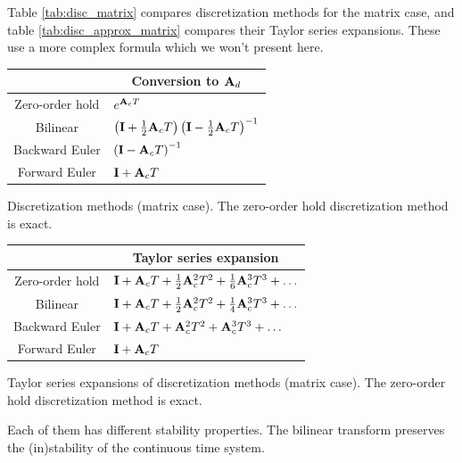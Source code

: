 Table \ref{tab:disc_matrix} compares \gls{discretization} methods for the matrix
case, and table \ref{tab:disc_approx_matrix} compares their Taylor series
expansions. These use a more complex formula which we won't present here.
\begin{booktable}
  \begin{tabular}{|cl|}
    \hline
    \rowcolor{headingbg}
    \multicolumn{1}{|c}{\textbf{Method}} &
      \multicolumn{1}{c|}{\textbf{Conversion to $\mathbf{A}_d$}} \\
    \hline
    Zero-order hold & $e^{\mathbf{A}_c T}$ \\
    Bilinear &
      $\left(\mathbf{I} + \frac{1}{2}\mathbf{A}_c T\right)
        \left(\mathbf{I} - \frac{1}{2}\mathbf{A}_c T\right)^{-1}$ \\
    Backward Euler & $\left(\mathbf{I} - \mathbf{A}_c T\right)^{-1}$ \\
    Forward Euler & $\mathbf{I} + \mathbf{A}_c T$ \\
    \hline
  \end{tabular}
  \caption{Discretization methods (matrix case). The zero-order hold
    discretization method is exact.}
  \label{tab:disc_matrix}
\end{booktable}
\begin{booktable}
  \begin{tabular}{|cl|}
    \hline
    \rowcolor{headingbg}
    \multicolumn{1}{|c}{\textbf{Method}} &
      \multicolumn{1}{c|}{\textbf{Taylor series expansion}} \\
    \hline
    Zero-order hold &
      $\mathbf{I} + \mathbf{A}_c T + \frac{1}{2}\mathbf{A}_c^2T^2 +
        \frac{1}{6}\mathbf{A}_c^3T^3 + \ldots$ \\
    Bilinear &
      $\mathbf{I} + \mathbf{A}_c T + \frac{1}{2}\mathbf{A}_c^2T^2 +
        \frac{1}{4}\mathbf{A}_c^3T^3 + \ldots$ \\
    Backward Euler &
      $\mathbf{I} + \mathbf{A}_c T + \mathbf{A}_c^2T^2 + \mathbf{A}_c^3T^3 + \ldots$ \\
    Forward Euler & $\mathbf{I} + \mathbf{A}_c T$ \\
    \hline
  \end{tabular}
  \caption{Taylor series expansions of discretization methods (matrix case).
    The zero-order hold discretization method is exact.}
  \label{tab:disc_approx_matrix}
\end{booktable}

Each of them has different stability properties. The bilinear transform
preserves the (in)stability of the continuous time \gls{system}.

